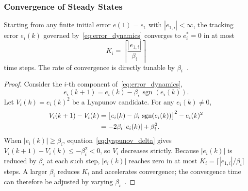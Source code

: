 
\subsubsection*{\centering Convergence of Steady States}

\begin{theorem}\label{thm:convergence}
	Starting from any finite initial error $e(1) = e_1$ with $|e_{1,i}|<\infty$,
	the tracking error $e_i(k)$ governed by~\eqref{eq:error_dynamics} converges to
	$e_i^{*} = 0$ in at most
	\begin{equation}
		K_i = \left\lceil\frac{|e_{1,i}|}{\beta_i}\right\rceil
		\label{eq:convergence_bound}
	\end{equation}
	time steps.  The rate of convergence is directly tunable by
	$\beta_i$~\cite{tymoshchuk2024tracking}.
\end{theorem}

\begin{proof}
	Consider the $i$-th component of~\eqref{eq:error_dynamics},
	\begin{equation}
		e_i(k+1) = e_i(k) - \beta_i\,\operatorname{sgn}(e_i(k)).
		\label{eq:scalar_error_dynamics}
	\end{equation}
	Let $V_i(k) = e_i(k)^{2}$ be a Lyapunov candidate.  For any $e_i(k)\neq 0$,
	\begin{align}
		V_i(k+1) - V_i(k)
		 & = \bigl[e_i(k) - \beta_i\,\operatorname{sgn}(e_i(k))\bigr]^{2} - e_i(k)^{2}
		\notag                                                                 \\
		 & = -2\beta_i\,|e_i(k)| + \beta_i^{2}.
		\label{eq:lyapunov_delta}
	\end{align}
	When $|e_i(k)| \geq \beta_i$, equation~\eqref{eq:lyapunov_delta} gives
	$V_i(k+1)-V_i(k) \leq -\beta_i^{2} < 0$, so $V_i$ decreases strictly.
	Because $|e_i(k)|$ is reduced by $\beta_i$ at each such step, $|e_i(k)|$
	reaches zero in at most $K_i = \lceil|e_{1,i}|/\beta_i\rceil$ steps.
	A larger $\beta_i$ reduces $K_i$ and accelerates convergence; the convergence
	time can therefore be adjusted by varying $\beta_i$~\cite{tymoshchuk2024tracking}.
\end{proof}
